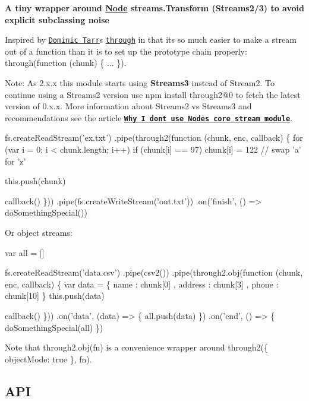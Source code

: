 \href{https://nodei.co/npm/through2/}{\tt }

{\bfseries A tiny wrapper around \mbox{\hyperlink{classNode}{Node}} streams.\+Transform (Streams2/3) to avoid explicit subclassing noise}

Inspired by \href{https://github.com/dominictarr}{\tt Dominic Tarr}\textquotesingle{}s \href{https://github.com/dominictarr/through}{\tt through} in that it\textquotesingle{}s so much easier to make a stream out of a function than it is to set up the prototype chain properly\+: {\ttfamily through(function (chunk) \{ ... \})}.

Note\+: As 2.\+x.\+x this module starts using {\bfseries Streams3} instead of Stream2. To continue using a Streams2 version use {\ttfamily npm install through2@0} to fetch the latest version of 0.\+x.\+x. More information about Streams2 vs Streams3 and recommendations see the article {\bfseries \href{http://r.va.gg/2014/06/why-i-dont-use-nodes-core-stream-module.html}{\tt Why I don\textquotesingle{}t use Node\textquotesingle{}s core \textquotesingle{}stream\textquotesingle{} module}}.


\begin{DoxyCode}
fs.createReadStream('ex.txt')
  .pipe(through2(function (chunk, enc, callback) \{
    for (var i = 0; i < chunk.length; i++)
      if (chunk[i] == 97)
        chunk[i] = 122 // swap 'a' for 'z'

    this.push(chunk)

    callback()
   \}))
  .pipe(fs.createWriteStream('out.txt'))
  .on('finish', () => doSomethingSpecial())
\end{DoxyCode}


Or object streams\+:


\begin{DoxyCode}
var all = []

fs.createReadStream('data.csv')
  .pipe(csv2())
  .pipe(through2.obj(function (chunk, enc, callback) \{
    var data = \{
        name    : chunk[0]
      , address : chunk[3]
      , phone   : chunk[10]
    \}
    this.push(data)

    callback()
  \}))
  .on('data', (data) => \{
    all.push(data)
  \})
  .on('end', () => \{
    doSomethingSpecial(all)
  \})
\end{DoxyCode}


Note that {\ttfamily through2.\+obj(fn)} is a convenience wrapper around {\ttfamily through2(\{ object\+Mode\+: true \}, fn)}.

\subsection*{A\+PI}

